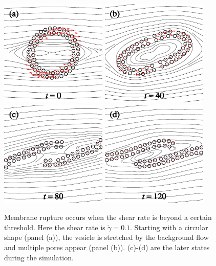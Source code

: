 \documentclass[lineno]{jfm}
\begin{document}
\begin{figure}
\centering
\includegraphics[height=2in]{N58_rupt_0.pdf}
\includegraphics[height=2in]{N58_rupt_200.pdf}
\\
\includegraphics[height=2in]{N58_rupt_400.pdf}
\includegraphics[height=2in]{N58_rupt_600.pdf}
  \caption{Membrane rupture occurs when the shear rate is beyond a certain threshold. Here the shear rate is $\dot\gamma = 0.1$. Starting with a circular shape (panel (a)), the vesicle is stretched by the background flow and multiple pores appear (panel (b)). (c)-(d) are the later states during the simulation.
  }
    \label{figure7}
\end{figure}
\end{document}
